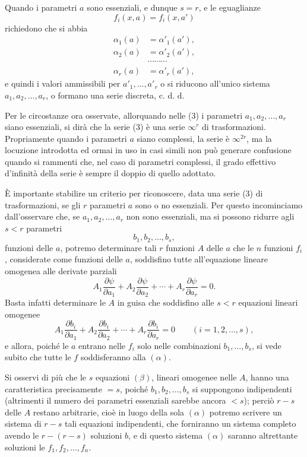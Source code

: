 \documentclass[11pt]{book}
\begin{document}
Quando i parametri $a$ sono essenziali, e dunque $s=r$, e le eguaglianze
\[
 f_i(x,a)=f_i(x,a')
\]
richiedono che si abbia
\[
\begin{aligned}
 \alpha_1(a)&=\alpha'_1(a'),\\
 \alpha_2(a)&=\alpha'_2(a'),\\
 &\cdots\cdots\cdots\\
 \alpha_r(a)&=\alpha'_r(a'),
\end{aligned}
\]
e quindi i valori ammissibili per $a'_1,\ldots,a'_r$ o si riducono all'unico sistema $a_1,a_2,\ldots,a_r$, o formano una serie discreta, c. d. d.

Per le circostanze ora osservate, allorquando nelle (3) i parametri $a_1,a_2,\ldots,a_r$ siano essenziali, si dirà che la serie (3) è una serie $\infty^r$ di trasformazioni. Propriamente quando i parametri $a$ siano complessi, la serie è $\infty^{2r}$, ma la locuzione introdotta ed ormai in uso in casi simili non può generare confusione quando si rammenti che, nel caso di parametri complessi, il grado effettivo d'infinità della serie è sempre il doppio di quello adottato.

È importante stabilire un criterio per riconoscere, data una serie (3) di trasformazioni, se gli $r$ parametri $a$ sono o no essenziali. Per questo incominciamo dall'osservare che, se $a_1,a_2,\ldots,a_r$ non sono essenziali, ma si possono ridurre agli $s<r$ parametri
\[
 b_1,b_2,\ldots,b_s,
\]
funzioni delle $a$, potremo determinare tali $r$ funzioni $A$ delle $a$ che le $n$ funzioni $f_i$, considerate come funzioni delle $a$, soddisfino tutte all'equazione lineare omogenea alle derivate parziali
\begin{equation*}\tag{$\alpha$}
 A_1\frac{\partial\psi}{\partial a_1}+A_2\frac{\partial\psi}{\partial a_2}+\cdots+A_r\frac{\partial\psi}{\partial a_r}=0.
\end{equation*}
Basta infatti determinare le $A$ in guisa che soddisfino alle $s<r$ equazioni lineari omogenee
\begin{equation*}\tag{$\beta$}
 A_1\frac{\partial b_i}{\partial a_1}+A_2\frac{\partial b_i}{\partial a_2}+\cdots+A_r\frac{\partial b_i}{\partial a_r}=0\qquad (i=1,2,\ldots,s),
\end{equation*}
e allora, poiché le $a$ entrano nelle $f_i$ solo nelle combinazioni $b_1,\ldots,b_s$, si vede subito che tutte le $f$ soddisferanno alla $(\alpha)$.

Si osservi di più che le $s$ equazioni $(\beta)$, lineari omogenee nelle $A$, hanno una caratteristica precisamente $=s$, poiché $b_1,b_2,\ldots,b_s$ si suppongono indipendenti (altrimenti il numero dei parametri essenziali sarebbe ancora $<s$); perciò $r-s$ delle $A$ restano arbitrarie, cioè in luogo della sola $(\alpha)$ potremo scrivere un sistema di $r-s$ tali equazioni indipendenti, che forniranno un sistema completo avendo le $r-(r-s)$ soluzioni $b$, e di questo sistema $(\alpha)$ saranno altrettante soluzioni le $f_1,f_2,\ldots,f_n$.
\end{document}
